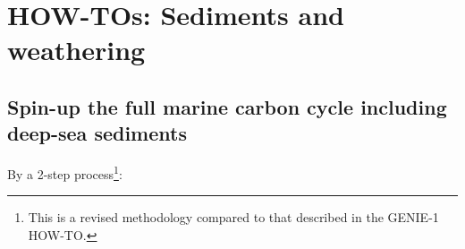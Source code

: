 \documentclass[10pt,twoside]{article}
\begin{document}

\newpage
\section{HOW-TOs: Sediments and weathering}\label{how-to-6}


\subsection{Spin-up the full marine carbon cycle including deep-sea sediments}\label{Spin-up the full marine carbon cycle including sediments}

By a 2-step process\footnote{This is a revised methodology compared to that described in the GENIE-1 HOW-TO.}:
\end{document}
